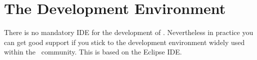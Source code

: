 \chapter{The Development Environment}

There is no mandatory IDE for the development of \ExTeX. Nevertheless
in practice you can get good support if you stick to the development
environment widely used within the \ExTeX\ community. This is based on
the Eclipse IDE.





